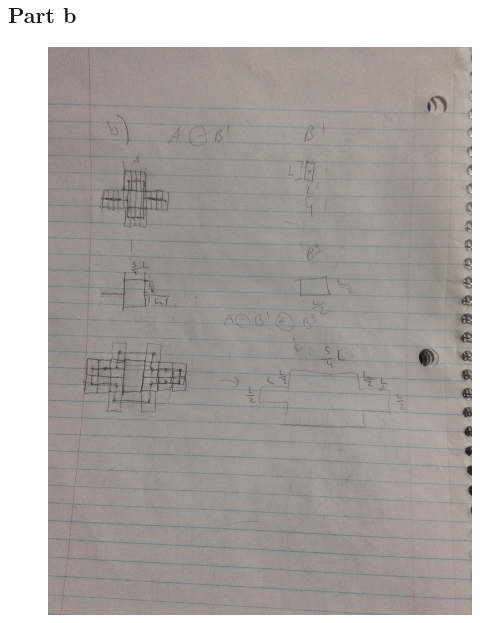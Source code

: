 \documentclass{article}
\begin{document}
	\subsection{Part b}
	\begin{figure}[H]
		\includegraphics[width=\linewidth]{9.6/fig2.JPG}
	\end{figure}
\end{document}
